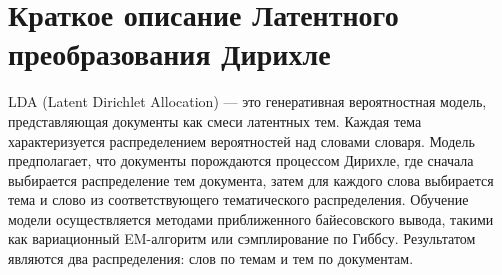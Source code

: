 \chapter{Краткое описание Латентного преобразования Дирихле}

LDA (Latent Dirichlet Allocation) --- это генеративная вероятностная модель, представляющая документы как смеси латентных тем. Каждая тема характеризуется распределением вероятностей над словами словаря. Модель предполагает, что документы порождаются процессом Дирихле, где сначала выбирается распределение тем документа, затем для каждого слова выбирается тема и слово из соответствующего тематического распределения. Обучение модели осуществляется методами приближенного байесовского вывода, такими как вариационный EM-алгоритм или сэмплирование по Гиббсу. Результатом являются два распределения: слов по темам и тем по документам.

\clearpage
